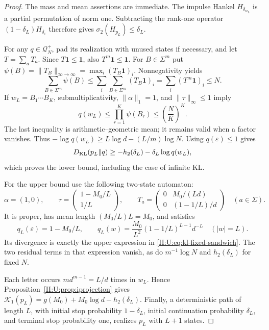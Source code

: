 \begin{proof}
The mass and mean assertions are immediate. The impulse Hankel
$H_{\delta_{w_L}}$ is a partial permutation of norm one. Subtracting
the rank-one operator $(1-\delta_L)H_{\delta_\varepsilon}$ therefore
gives $\sigma_2(H_{p_L})\le\delta_L$.

For any $q\in\mathcal Q_N^+$, pad its realization with unused states
if necessary, and let $T=\sum_aT_a$. Since $T\mathbf1\le\mathbf1$,
also $T^m\mathbf1\le\mathbf1$. For $B\in\Sigma^m$ put
$\psi(B)=\|T_B\|_{\infty\to\infty}
=\max_i(T_B\mathbf1)_i$. Nonnegativity yields
\[
 \sum_{B\in\Sigma^m}\psi(B)
 \le\sum_i\sum_{B\in\Sigma^m}(T_B\mathbf1)_i
 =\sum_i(T^m\mathbf1)_i\le N.
\]
If $w_L=B_1\cdots B_K$, submultiplicativity, $\|\alpha\|_1=1$,
and $\|\tau\|_\infty\le1$ imply
\[
 q(w_L)\le\prod_{r=1}^K\psi(B_r)
 \le\left(\frac NK\right)^K.
\]
The last inequality is arithmetic--geometric mean; it remains valid
when a factor vanishes. Thus
$-\log q(w_L)\ge L\log d-(L/m)\log N$.
Using $q(\varepsilon)\le1$ gives
\[
 D_{\rm KL}(p_L\|q)
 \ge-h_2(\delta_L)-\delta_L\log q(w_L),
\]
which proves the lower bound, including the case of infinite KL.

For the upper bound use the following two-state automaton:
\[
 \alpha=(1,0),\qquad
 \tau=\begin{pmatrix}1-M_0/L\\1/L\end{pmatrix},\qquad
 T_a=\begin{pmatrix}
 0&M_0/(Ld)\\0&(1-1/L)/d
 \end{pmatrix}\quad(a\in\Sigma).
\]
It is proper, has mean length $(M_0/L)L=M_0$, and satisfies
\[
 q_L(\varepsilon)=1-M_0/L,\qquad
 q_L(w)=\frac{M_0}{L^2}(1-1/L)^{L-1}d^{-L}
 \quad(|w|=L).
\]
Its divergence is exactly the upper expression in
\eqref{II:U:eq:kl-fixed-sandwich}. The two residual terms in that expression
vanish, as do $m^{-1}\log N$ and $h_2(\delta_L)$ for fixed $N$.

Each letter occurs $md^{m-1}=L/d$ times in $w_L$. Hence
Proposition~\ref{II:U:prop:iprojection} gives
$\mathcal K_1(p_L)=g(M_0)+M_0\log d-h_2(\delta_L)$.
Finally, a deterministic path of length $L$, with initial stop
probability $1-\delta_L$, initial continuation probability $\delta_L$,
and terminal stop probability one, realizes $p_L$ with $L+1$ states.
\end{proof}
